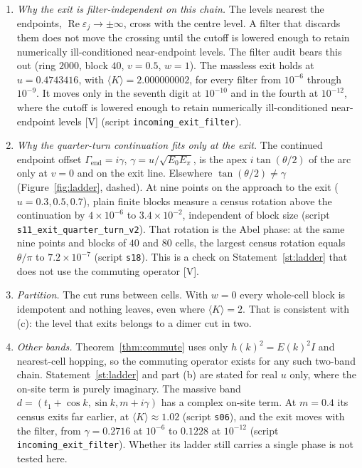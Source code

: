 \documentclass[11pt]{article}
\theoremstyle{definition}
\newcommand{\grade}[1]{\textsf{\small[#1]}}
\newcommand{\Rea}{\operatorname{Re}}
\begin{document}
\begin{enumerate}
\item \emph{Why the exit is filter-independent on this chain.} The levels nearest the endpoints, $\Rea\varepsilon_j\to\pm\infty$, cross with the centre level. A filter that discards them does not move the crossing until the cutoff is lowered enough to retain numerically ill-conditioned near-endpoint levels. The filter audit bears this out (ring $2000$, block $40$, $v=0.5$, $w=1$). The massless exit holds at $u=0.4743416$, with $\langle K\rangle=2.000000002$, for every filter from $10^{-6}$ through $10^{-9}$. It moves only in the seventh digit at $10^{-10}$ and in the fourth at $10^{-12}$, where the cutoff is lowered enough to retain numerically ill-conditioned near-endpoint levels \grade{V} (script \texttt{incoming\_exit\_filter}).
\item \emph{Why the quarter-turn continuation fits only at the exit.} The continued endpoint offset $\Gamma_{\mathrm{end}}=i\gamma$, $\gamma=u/\sqrt{E_0E_\pi}$, is the apex $i\tan(\theta/2)$ of the arc only at $v=0$ and on the exit line. Elsewhere $\tan(\theta/2)\ne\gamma$ (Figure~\ref{fig:ladder}, dashed). At nine points on the approach to the exit ($u=0.3,0.5,0.7$), plain finite blocks measure a census rotation above the continuation by $4\times10^{-6}$ to $3.4\times10^{-2}$, independent of block size (script \texttt{s11\_exit\_quarter\_turn\_v2}). That rotation is the Abel phase: at the same nine points and blocks of $40$ and $80$ cells, the largest census rotation equals $\theta/\pi$ to $7.2\times10^{-7}$ (script \texttt{s18}). This is a check on Statement~\ref{st:ladder} that does not use the commuting operator \grade{V}.
\item \emph{Partition.} The cut runs between cells. With $w=0$ every whole-cell block is idempotent and nothing leaves, even where $\langle K\rangle=2$. That is consistent with (c): the level that exits belongs to a dimer cut in two.
\item \emph{Other bands.} Theorem~\ref{thm:commute} uses only $h(k)^2=E(k)^2I$ and nearest-cell hopping, so the commuting operator exists for any such two-band chain. Statement~\ref{st:ladder} and part (b) are stated for real $u$ only, where the on-site term is purely imaginary. The massive band $d=(t_1+\cos k,\sin k,m+i\gamma)$ has a complex on-site term. At $m=0.4$ its census exits far earlier, at $\langle K\rangle\approx1.02$ (script \texttt{s06}), and the exit moves with the filter, from $\gamma=0.2716$ at $10^{-6}$ to $0.1228$ at $10^{-12}$ (script \texttt{incoming\_exit\_filter}). Whether its ladder still carries a single phase is not tested here.
\end{enumerate}
\end{document}
